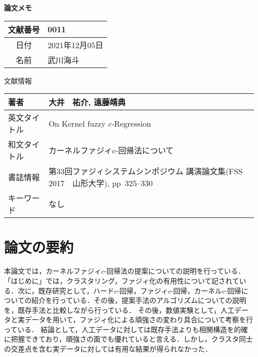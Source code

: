 \documentclass[10pt,onecolumn]{jsarticle}
\begin{document}
\vspace{-20mm}
\begin{center}
{\LARGE\textbf{論文メモ}}
\end{center}

\begin{flushright}
\begin{tabular}{|c|l|}
\hline
文献番号  &  0011
\\
\hline
日付  &  2021年12月05日
\\
\hline
名前  &  武川海斗
\\
\hline
\end{tabular}
\end{flushright}


%
%
\begin{center}
{\large 文献情報}
\begin{table}[hbp]%
\begin{tabular}{|l||l|}
\hline
著者  &  大井　祐介, 遠藤靖典
\\ \hline
英文タイトル  & On Kernel fuzzy $c$-Regression
\\ \hline
和文タイトル  & カーネルファジィ$c$-回帰法について
\\ \hline
書誌情報  &  第33回ファジィシステムシンポジウム 講演論文集(FSS 2017　山形大学), pp~325--330
\\ \hline
キーワード & なし
\\ \hline
\end{tabular}
\end{table}
\end{center}

\section{論文の要約}
本論文では，カーネルファジィ$c$-回帰法の提案についての説明を行っている．「はじめに」では，クラスタリング，ファジィ化の有用性について記されている．次に，既存研究として，ハード$c$-回帰，ファジィ$c$-回帰，カーネル$c$-回帰についての紹介を行っている．その後，提案手法のアルゴリズムについての説明を，既存手法と比較しながら行っている．
その後，数値実験として，人工データと実データを用いて，ファジィ化による頑強さの変わり具合について考察を行っている．
結論として，人工データに対しては既存手法よりも相関構造を的確に把握できており，頑強さの面でも優れていると言える．しかし，クラスタ同士の交差点を含む実データに対しては有用な結果が得られなかった．
\end{document}
